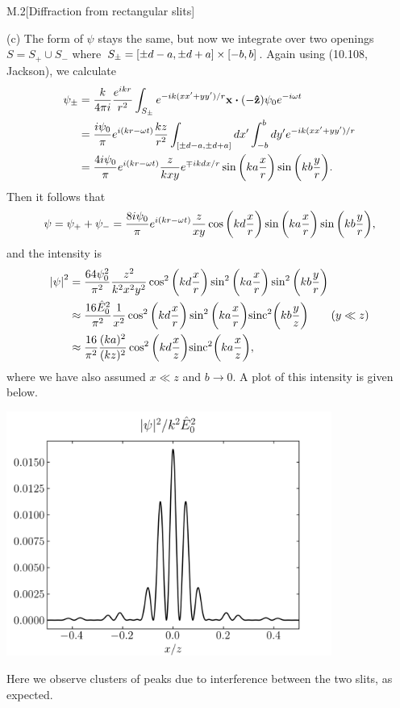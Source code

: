 \documentclass[12pt]{article}
\begin{document}
\begin{problem}{M.2}[Diffraction from rectangular slits]
\begin{solution}
(c) The form of $\psi$ stays the same, but now we integrate over two openings
$S=S_+\cup S_-$ where $S_\pm=\qty[\pm d-a,\pm d+a]\times[-b,b]$. Again using
(10.108, Jackson), we calculate
\begin{align}
    \psi_\pm
    &=\frac{k}{4\pi i}\frac{e^{ikr}}{r^2}
    \int_{S_\pm}e^{-ik(xx'+yy')/r}\vb{x}\vdot(-\zhat)\psi_0
        e^{-i\omega t}\notag\\
    &=\frac{i\psi_0}{\pi}e^{i(kr-\omega t)}\frac{kz}{r^2}
    \int_{[\pm d-a,\pm d+a]}dx'\int_{-b}^bdy'e^{-ik(xx'+yy')/r}\notag\\
    &=\frac{4i\psi_0}{\pi}e^{i(kr-\omega t)}\frac{z}{kxy}e^{\mp
    ikdx/r}\sin\qty(ka\frac{x}{r})\sin\qty(kb\frac{y}{r}).
\end{align}
Then it follows that
\begin{equation}
    \psi=\psi_++\psi_-
    =\frac{8i\psi_0}{\pi}e^{i(kr-\omega
    t)}\frac{z}{xy}\cos\qty(kd\frac{x}{r})\sin\qty(ka\frac{x}{r})\sin\qty(kb\frac{y}{r}),
\end{equation}
and the intensity is
\begin{align}\label{p2c:I}
    \abs{\psi}^2
    &=\frac{64\psi_0^2}{\pi^2}\frac{z^2}{k^2x^2y^2}\cos^2\qty(kd\frac{x}{r})\sin^2\qty(ka\frac{x}{r})\sin^2\qty(kb\frac{y}{r})\notag\\
    &\approx\frac{16\hat{E}_0^2}{\pi^2}\frac1{x^2}\cos^2\qty(kd\frac{x}{r})\sin^2\qty(ka\frac{x}{r})\text{sinc}^2\qty(kb\frac{y}{z})\tag{$y\ll
    z$}\\
    &\approx\frac{16}{\pi^2}\frac{(ka)^2}{(kz)^2}\cos^2\qty(kd\frac{x}{z})
    \text{sinc}^2\qty(ka\frac{x}{z}),
\end{align}
where we have also assumed $x\ll z$ and $b\to0$. A plot of this intensity is 
given below.
\begin{center}
    \includegraphics[width=0.8\textwidth]{p2c.png} 
\end{center}
Here we observe clusters of peaks due to interference between the two slits, as
expected.

\end{solution}
\end{problem}
\end{document}
